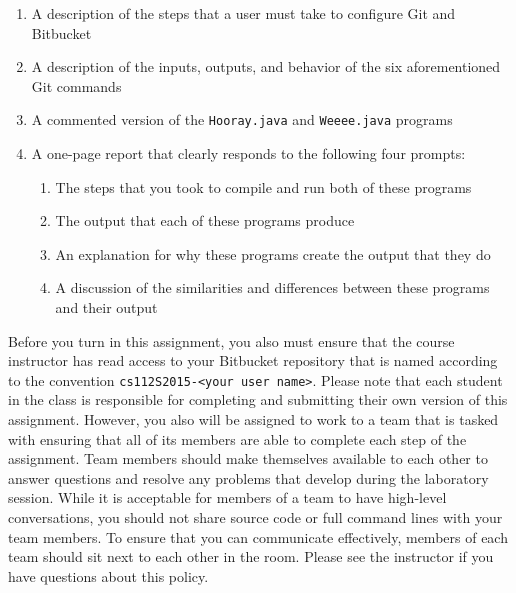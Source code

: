   \vspace*{-.05in}
  \begin{enumerate}
        
    \item A description of the steps that a user must take to configure Git and Bitbucket

    \item A description of the inputs, outputs, and behavior of the six aforementioned Git commands

    \item A commented version of the {\tt Hooray.java} and {\tt Weeee.java} programs
        
    \item A one-page report that clearly responds to the following four prompts:
  
      \vspace*{-.05in}
      \begin{enumerate}

        \item The steps that you took to compile and run both of these programs

        \item The output that each of these programs produce

        \item An explanation for why these programs create the output that they do

        \item A discussion of the similarities and differences between these programs and their output

      \end{enumerate}

  \end{enumerate}

Before you turn in this assignment, you also must ensure that the course instructor has read access to your Bitbucket
repository that is named according to the convention {\tt cs112S2015-<your user name>}. Please note that each student in
the class is responsible for completing and submitting their own version of this assignment.  However, you also will be
assigned to work to a team that is tasked with ensuring that all of its members are able to complete each step of the
assignment.  Team members should make themselves available to each other to answer questions and resolve any problems
that develop during the laboratory session. While it is acceptable for members of a team to have high-level
conversations, you should not share source code or full command lines with your team members. To ensure that you can
communicate effectively, members of each team should sit next to each other in the room.  Please see the instructor if
you have questions about this policy.


